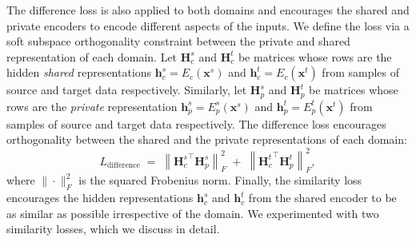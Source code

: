 \documentclass{article}
\newcommand{\bs}[1]{\boldsymbol{\mathbf{#1}}}
\begin{document}
The difference loss is also applied to both domains and encourages the
shared and private encoders to encode different aspects of the inputs. We define
the loss via a soft subspace orthogonality constraint between the
private and shared representation of each domain. Let $\bs H_c^s$ and $\bs H_c^t$ 
be matrices whose rows are the hidden \textit{shared} representations
$\bs h_c^s = E_c({\bs x}^s)$ and $\bs h_c^t = E_c({\bs x}^t)$ from samples of source
and target data respectively. Similarly, let $\bs H_p^s$ and $\bs H_p^t$ be matrices
whose rows are the \textsl{private} representation $\bs h_p^s=E_p^s({\bs x}^s)$ and
$\bs h_p^t=E_p^t({\bs x}^t)$ from samples of source and target data respectively. The
difference loss encourages orthogonality between the shared and the private
representations of each domain:
\begin{equation}
L_\mathrm{difference}\;=\; \left\|{\bs H_c^s}^\top \bs H_p^s\right\|_F^2 \; + \; \left\|{\bs H_c^t}^\top \bs H_p^t\right\|_F^2,
\end{equation}
where $\|\cdot\|_F^2$ is the squared Frobenius norm.
Finally, the similarity loss encourages the hidden
representations ${\bs h}_c^s$ and ${\bs h}_c^t$ from the shared encoder to be as
similar as possible irrespective of the domain. We experimented with two similarity losses, which we discuss in detail.
\end{document}
